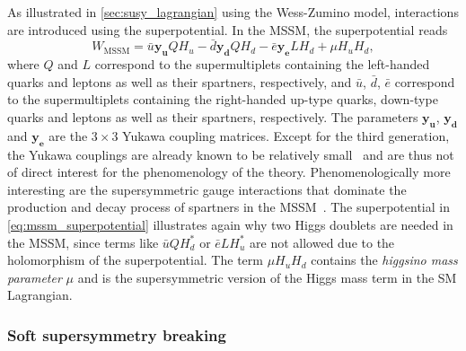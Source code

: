 As illustrated in \cref{sec:susy_lagrangian} using the Wess-Zumino model, interactions are introduced using the superpotential. In the MSSM, the superpotential reads
\begin{equation}
	W_\mathrm{MSSM} = \bar{u}\boldsymbol{y_u}QH_u - \bar{d}\boldsymbol{y_d}QH_d - \bar{e}\boldsymbol{y_e}LH_d + \mu H_uH_d,
	\label{eq:mssm_superpotential}
\end{equation}
where $Q$ and $L$ correspond to the supermultiplets containing the left-handed quarks and leptons as well as their spartners, respectively, and $\bar{u}$, $\bar{d}$, $\bar{e}$ correspond to the supermultiplets containing the right-handed up-type quarks, down-type quarks and leptons as well as their spartners, respectively. The parameters $\boldsymbol{y_u}$, $\boldsymbol{y_d}$ and $\boldsymbol{y_e}$ are the $3\times 3$ Yukawa coupling matrices. Except for the third generation, the Yukawa couplings are already known to be relatively small~\cite{Martin:1997ns} and are thus not of direct interest for the phenomenology of the theory. Phenomenologically more interesting are the supersymmetric gauge interactions that dominate the production and decay process of spartners in the MSSM~\cite{Martin:1997ns}. The superpotential in \cref{eq:mssm_superpotential} illustrates again why two Higgs doublets are needed in the MSSM, since terms like $\bar{u}QH_d^*$ or $\bar{e}LH_u^*$ are not allowed due to the holomorphism of the superpotential. The term $\mu H_u H_d$ contains the \textit{higgsino mass parameter} $\mu$ and is the supersymmetric version of the Higgs mass term in the SM Lagrangian.


\subsubsection{Soft supersymmetry breaking}\label{sec:susy_breaking}

